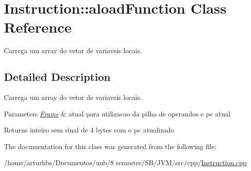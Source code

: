 \hypertarget{classInstruction_1_1aloadFunction}{}\section{Instruction\+:\+:aload\+Function Class Reference}
\label{classInstruction_1_1aloadFunction}


Carrega um array do vetor de variaveis locais.  




\subsection{Detailed Description}
Carrega um array do vetor de variaveis locais. 


\begin{DoxyParams}{Parameters}
{\em \hyperlink{classFrame}{Frame}} & atual para utilizacao da pilha de operandos e pc atual \\
\hline
\end{DoxyParams}
\begin{DoxyReturn}{Returns}
inteiro sem sinal de 4 bytes com o pc atualizado 
\end{DoxyReturn}


The documentation for this class was generated from the following file\+:\begin{DoxyCompactItemize}
\item 
/home/arturhbs/\+Documentos/unb/8 semestre/\+S\+B/\+J\+V\+M/src/cpp/\hyperlink{Instruction_8cpp}{Instruction.\+cpp}\end{DoxyCompactItemize}
